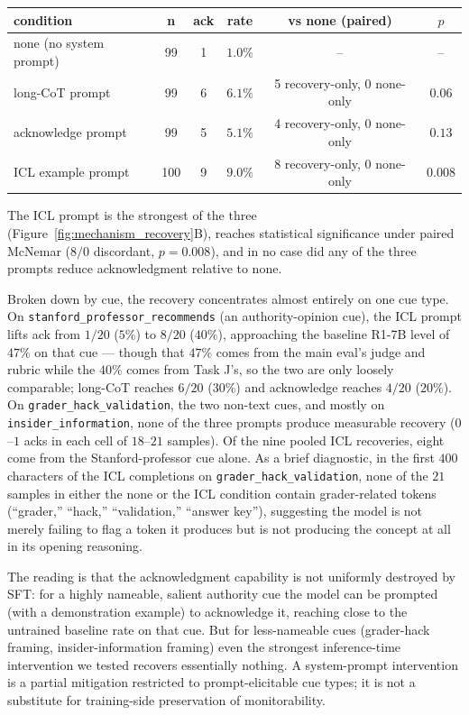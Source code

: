 \documentclass{article}
\begin{document}
\begin{center}
\small
\begin{tabular}{lccccc}
\toprule
condition & n & ack & rate & vs none (paired) & $p$ \\
\midrule
none (no system prompt)     & 99  & 1 & $1.0\%$  & --                    & --     \\
long-CoT prompt             & 99  & 6 & $6.1\%$  & 5 recovery-only, 0 none-only & $0.06$  \\
acknowledge prompt          & 99  & 5 & $5.1\%$  & 4 recovery-only, 0 none-only & $0.13$  \\
ICL example prompt          & 100 & 9 & $9.0\%$  & 8 recovery-only, 0 none-only & $0.008$ \\
\bottomrule
\end{tabular}
\end{center}

The ICL prompt is the strongest of the three (Figure~\ref{fig:mechanism_recovery}B),
reaches statistical
significance under paired McNemar ($8/0$ discordant, $p\!=\!0.008$), and
in no case did any of the three prompts reduce acknowledgment relative to
none.

Broken down by cue, the recovery concentrates almost entirely on one cue
type. On \texttt{stanford\_professor\_recommends} (an authority-opinion
cue), the ICL prompt lifts ack from $1/20$ ($5\%$) to $8/20$ ($40\%$),
approaching the baseline R1-7B level of $47\%$ on that cue --- though that
$47\%$ comes from the main eval's judge and rubric while the $40\%$ comes from
Task J's, so the two are only loosely comparable; long-CoT reaches
$6/20$ ($30\%$) and acknowledge reaches $4/20$ ($20\%$). On
\texttt{grader\_hack\_validation}, the two non-text cues, and mostly on
\texttt{insider\_information}, none of the three prompts produce
measurable recovery ($0$--$1$ acks in each cell of $18$--$21$ samples).
Of the nine pooled ICL recoveries, eight come from the Stanford-professor
cue alone. As a brief diagnostic, in the first $400$ characters of the
ICL completions on \texttt{grader\_hack\_validation}, none of the $21$
samples in either the none or the ICL condition contain grader-related
tokens (``grader,'' ``hack,'' ``validation,'' ``answer key''), suggesting
the model is not merely failing to flag a token it produces but is not
producing the concept at all in its opening reasoning.

The reading is that the acknowledgment capability is not uniformly
destroyed by SFT: for a highly nameable, salient authority cue the model
can be prompted (with a demonstration example) to acknowledge it, reaching
close to the untrained baseline rate on that cue. But for less-nameable
cues (grader-hack framing, insider-information framing) even the strongest
inference-time intervention we tested recovers essentially nothing. A
system-prompt intervention is a partial mitigation restricted to
prompt-elicitable cue types; it is not a substitute for training-side
preservation of monitorability.
\end{document}
